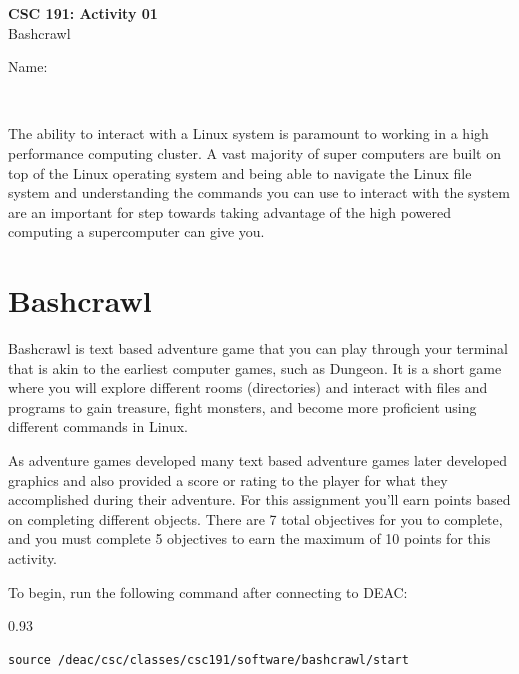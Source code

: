 \documentclass[10pt, twoside]{article}
\newcounter{qcnt}
\newcounter{sqcnt}
\begin{document}
\setcounter{qcnt}{1}
\setcounter{sqcnt}{1}
\parbox{3.0in}{{\large \textbf{CSC 191: Activity 01}}\\Bashcrawl\\}\hfill
\parbox{3.0in}{Name: \hrulefill \vspace{6pt} \\} \\\hrulefill

The ability to interact with a Linux system is paramount to working in a high performance computing cluster. A vast majority of super computers are built on top of the Linux operating system and being able to navigate the Linux file system and understanding the commands you can use to interact with the system are an important for step towards taking advantage of the high powered computing a supercomputer can give you.

\section{Bashcrawl}

Bashcrawl is text based adventure game that you can play through your terminal that is akin to the earliest computer games, such as Dungeon. It is a short game where you will explore different rooms (directories) and interact with files and programs to gain treasure, fight monsters, and become more proficient using different commands in Linux.


As adventure games developed many text based adventure games later developed graphics and also provided a score or rating to the player for what they accomplished during their adventure. For this assignment you'll earn points based on completing different objects. There are 7 total objectives for you to complete, and you must complete 5 objectives to earn the maximum of 10 points for this activity.

To begin, run the following command after connecting to DEAC:

\vspace{0.2in}

\begin{boxedminipage}[]{0.93\textwidth}
\begin{verbatim}
source /deac/csc/classes/csc191/software/bashcrawl/start
\end{verbatim}
\end{boxedminipage}
\newline
\end{document}
